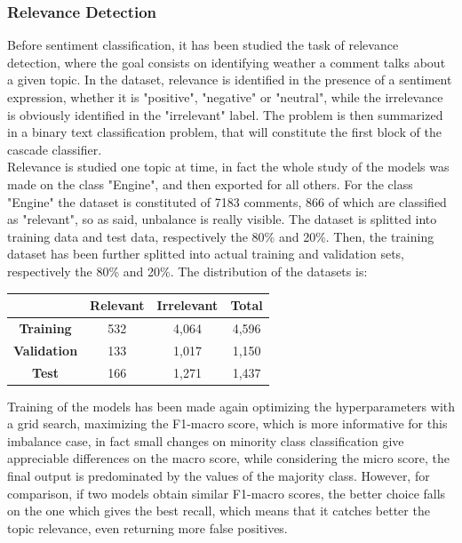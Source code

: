 \subsubsection{Relevance Detection}

Before sentiment classification, it has been studied the task of relevance detection, where the goal consists on identifying weather a comment talks about a given topic. In the dataset, relevance is identified in the presence of a sentiment expression, whether it is "positive", "negative" or "neutral", while the irrelevance is obviously identified in the "irrelevant" label. The problem is then summarized in a binary text classification problem, that will constitute the first block of the cascade classifier.\\
Relevance is studied one topic at time, in fact the whole study of the models was made on the class "Engine", and then exported for all others. For the class "Engine" the dataset is constituted of 7183 comments, 866 of which are classified as "relevant", so as said, unbalance is really visible. The dataset is splitted into training data and test data, respectively the 80\% and 20\%. Then, the training dataset has been further splitted into actual training and validation sets, respectively the 80\% and 20\%. The distribution of the datasets is:

\begin{center}
	\begin{tabular}{ | c  c  c | c | } 
		\hline
		& \textbf{Relevant} & \textbf{Irrelevant} & \textbf{Total} \\
		\hline
		\textbf{Training} & 532 & 4,064 & 4,596 \\ 
		\hline
		\textbf{Validation} & 133 & 1,017 & 1,150 \\ 
		\hline
		\textbf{Test} & 166 & 1,271 & 1,437\\
		\hline
	\end{tabular}
\end{center}

Training of the models has been made again optimizing the hyperparameters with a grid search, maximizing the F1-macro score, which is more informative for this imbalance case, in fact small changes on minority class classification give appreciable differences on the macro score, while considering the micro score, the final output is predominated by the values of the majority class. However, for comparison, if two models obtain similar F1-macro scores, the better choice falls on the one which gives the best recall, which means that it catches better the topic relevance, even returning more false positives.



